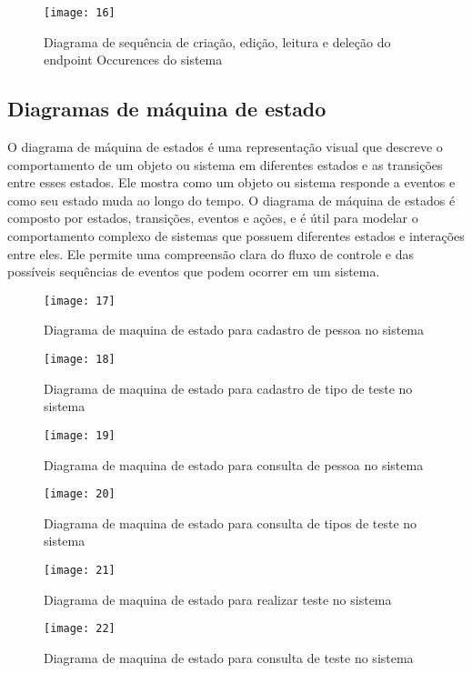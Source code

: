 \begin{figure}[h]
  \caption{Diagrama de sequência de criação, edição, leitura e deleção do endpoint Occurences do sistema}
  \centering
  \texttt{[image: 16]}
\end{figure}
\FloatBarrier

\subsection{Diagramas de máquina de estado}

O diagrama de máquina de estados \cite{30} é uma representação visual que descreve o comportamento de um objeto ou sistema em diferentes estados e as transições entre esses estados. Ele mostra como um objeto ou sistema responde a eventos e como seu estado muda ao longo do tempo. O diagrama de máquina de estados é composto por estados, transições, eventos e ações, e é útil para modelar o comportamento complexo de sistemas que possuem diferentes estados e interações entre eles. Ele permite uma compreensão clara do fluxo de controle e das possíveis sequências de eventos que podem ocorrer em um sistema.

\begin{figure}[h]
  \caption{Diagrama de maquina de estado para cadastro de pessoa no sistema}
  \centering
  \texttt{[image: 17]}
\end{figure}
\FloatBarrier

\begin{figure}[h]
  \caption{Diagrama de maquina de estado para cadastro de tipo de teste no sistema}
  \centering
  \texttt{[image: 18]}
\end{figure}
\FloatBarrier

\begin{figure}[h]
  \caption{Diagrama de maquina de estado para consulta de pessoa no sistema}
  \centering
  \texttt{[image: 19]}
\end{figure}
\FloatBarrier

\begin{figure}[h]
  \caption{Diagrama de maquina de estado para consulta de tipos de teste no sistema}
  \centering
  \texttt{[image: 20]}
\end{figure}
\FloatBarrier

\begin{figure}[h]
  \caption{Diagrama de maquina de estado para realizar teste no sistema}
  \centering
  \texttt{[image: 21]}
\end{figure}
\FloatBarrier

\begin{figure}[h]
  \caption{Diagrama de maquina de estado para consulta de teste no sistema}
  \centering
  \texttt{[image: 22]}
\end{figure}
\FloatBarrier
